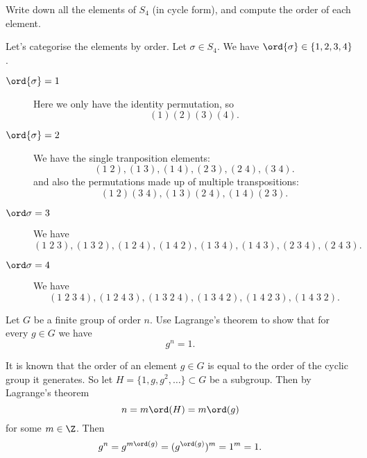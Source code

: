 \setcounter{question}{17}
\question Write down all the elements of $S_4$ (in cycle form),
and compute the order of each element.
\begin{solution}
    Let's categorise the elements by order.
    Let $\sigma \in S_4$.
    We have $\ord{\sigma} \in \{1,2,3,4\}$.
    \begin{description}
        \item[$\ord{\sigma} = 1$]
            Here we only have the identity permutation, so
            \[
                (1)(2)(3)(4).
            \]

        \item[$\ord{\sigma} = 2$]
            We have the single tranposition elements:
            \[
                (1\;2), (1\;3), (1\;4), (2\;3), (2\;4), (3\;4).
            \]
            and also the permutations made up of multiple transpositions:
            \[
                (1\;2)(3\;4), (1\;3)(2\;4), (1\;4)(2\;3).
            \]

        \item[$\ord\sigma = 3$]
            We have
            \[
                (1\;2\;3), (1\;3\;2),
                (1\;2\;4), (1\;4\;2),
                (1\;3\;4), (1\;4\;3),
                (2\;3\;4), (2\;4\;3).
            \]

        \item[$\ord\sigma = 4$]
            We have
            \[
                (1\;2\;3\;4), (1\;2\;4\;3),
                (1\;3\;2\;4), (1\;3\;4\;2),
                (1\;4\;2\;3), (1\;4\;3\;2).
            \]
    \end{description}
\end{solution}

\question Let $G$ be a finite group of order $n$.
Use Lagrange's theorem to show that for every $g \in G$ we have
\[
    g^n = 1.
\]
\begin{solution}
    It is known that the order of an element $g \in G$
    is equal to the order of the cyclic group it generates.
    So let $H = \{1, g, g^2, \ldots\} \subset G$ be a subgroup.
    Then by Lagrange's theorem
    \[
        n = m \ord(H) = m\ord(g)
    \]
    for some $m \in \Z$.
    Then
    \[
        g^n = g^{m\ord(g)} = (g^{\ord(g)})^m = 1^m = 1.
    \]
\end{solution}

